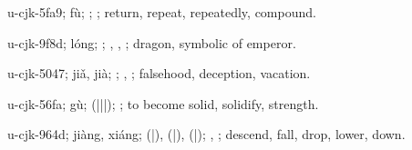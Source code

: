 \begin{multicols}{2}
{\cjkgGlue{}u-cjk-5fa9; fù; \cjkgGlue{}; \cjkgGlue{}; return, repeat, repeatedly, compound.

\cjkgGlue{}u-cjk-9f8d; lóng; \cjkgGlue{}; \cjkgGlue{}, \cjkgGlue{}, \cjkgGlue{}; dragon, symbolic of emperor.

\cjkgGlue{}u-cjk-5047; jiǎ, jià; \cjkgGlue{}\cjkgGlue{}\cjkgGlue{}; \cjkgGlue{}, \cjkgGlue{}; falsehood, deception, vacation.

\cjkgGlue{}u-cjk-56fa; gù; \cjkgGlue{}\cjkgGlue{}(\cjkgGlue{}|\cjkgGlue{}|\cjkgGlue{}|\cjkgGlue{}); \cjkgGlue{}; to become solid, solidify, strength.

\cjkgGlue{}u-cjk-964d; jiàng, xiáng; \cjkgGlue{}\cjkgGlue{}(\cjkgGlue{}|\cjkgGlue{}), \cjkgGlue{}\cjkgGlue{}(\cjkgGlue{}|\cjkgGlue{}), \cjkgGlue{}\cjkgGlue{}(\cjkgGlue{}|\cjkgGlue{}); \cjkgGlue{}, \cjkgGlue{}; descend, fall, drop, lower, down.

}
\end{multicols}
